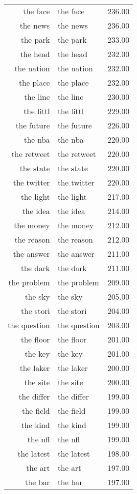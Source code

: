 \begin{table}[ht]
\begin{tabular}{rlr}
  the face & the face & 236.00 \\ 
  the news & the news & 236.00 \\ 
  the park & the park & 233.00 \\ 
  the head & the head & 232.00 \\ 
  the nation & the nation & 232.00 \\ 
  the place & the place & 232.00 \\ 
  the line & the line & 230.00 \\ 
  the littl & the littl & 229.00 \\ 
  the future & the future & 226.00 \\ 
  the nba & the nba & 220.00 \\ 
  the retweet & the retweet & 220.00 \\ 
  the state & the state & 220.00 \\ 
  the twitter & the twitter & 220.00 \\ 
  the light & the light & 217.00 \\ 
  the idea & the idea & 214.00 \\ 
  the money & the money & 212.00 \\ 
  the reason & the reason & 212.00 \\ 
  the answer & the answer & 211.00 \\ 
  the dark & the dark & 211.00 \\ 
  the problem & the problem & 209.00 \\ 
  the sky & the sky & 205.00 \\ 
  the stori & the stori & 204.00 \\ 
  the question & the question & 203.00 \\ 
  the floor & the floor & 201.00 \\ 
  the key & the key & 201.00 \\ 
  the laker & the laker & 200.00 \\ 
  the site & the site & 200.00 \\ 
  the differ & the differ & 199.00 \\ 
  the field & the field & 199.00 \\ 
  the kind & the kind & 199.00 \\ 
  the nfl & the nfl & 199.00 \\ 
  the latest & the latest & 198.00 \\ 
  the art & the art & 197.00 \\ 
  the bar & the bar & 197.00 \\ 

\end{tabular}
\end{table}
